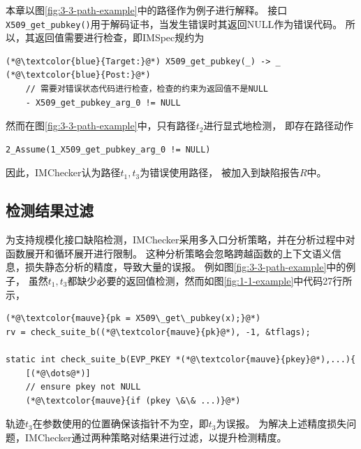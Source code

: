 本章以图\ref{fig:3-3-path-example}中的路径作为例子进行解释。
接口\texttt{X509\_get\_pubkey()}用于解码证书，当发生错误时其返回NULL作为错误代码。
所以，其返回值需要进行检查，即IMSpec规约为
\begin{lstlisting}[language={[ANSI]C},
basicstyle=\linespread{0.8}\listingsfont,
numbers=none,
xleftmargin=.15\textwidth]
(*@\textcolor{blue}{Target:}@*) X509_get_pubkey(_) -> _
(*@\textcolor{blue}{Post:}@*) 
	// 需要对错误状态代码进行检查，检查的约束为返回值不是NULL
	- X509_get_pubkey_arg_0 != NULL
\end{lstlisting}
然而在图\ref{fig:3-3-path-example}中，只有路径$t_2$进行显式地检测，
即存在路径动作
\begin{lstlisting}[language={[ANSI]C},
basicstyle=\linespread{0.8}\listingsfont,
numbers=none,
xleftmargin=.15\textwidth]
2_Assume(1_X509_get_pubkey_arg_0 != NULL)
\end{lstlisting}
因此，IMChecker认为路径$t_1, t_3$为错误使用路径，
被加入到缺陷报告$R$中。

\subsection{检测结果过滤}
为支持规模化接口缺陷检测，IMChecker采用多入口分析策略，并在分析过程中对函数展开和循环展开进行限制。
这种分析策略会忽略跨越函数的上下文语义信息，损失静态分析的精度，导致大量的误报。
例如图\ref{fig:3-3-path-example}中的例子，
虽然$t_1, t_3$都缺少必要的返回值检测，然而如图\ref{fig:1-1-example}中代码27行所示，
\begin{lstlisting}[language={[ANSI]C},
basicstyle=\linespread{0.7}\listingsfont,
numbers=none,
xleftmargin=.25\textwidth]
(*@\textcolor{mauve}{pk = X509\_get\_pubkey(x);}@*)
rv = check_suite_b((*@\textcolor{mauve}{pk}@*), -1, &tflags);
	
static int check_suite_b(EVP_PKEY *(*@\textcolor{mauve}{pkey}@*),...){
	[(*@\dots@*)]
	// ensure pkey not NULL
	(*@\textcolor{mauve}{if (pkey \&\& ...)}@*)
\end{lstlisting}
轨迹$t_3$在参数使用的位置确保该指针不为空，即$t_3$为误报。
为解决上述精度损失问题，IMChecker通过两种策略对结果进行过滤，以提升检测精度。

